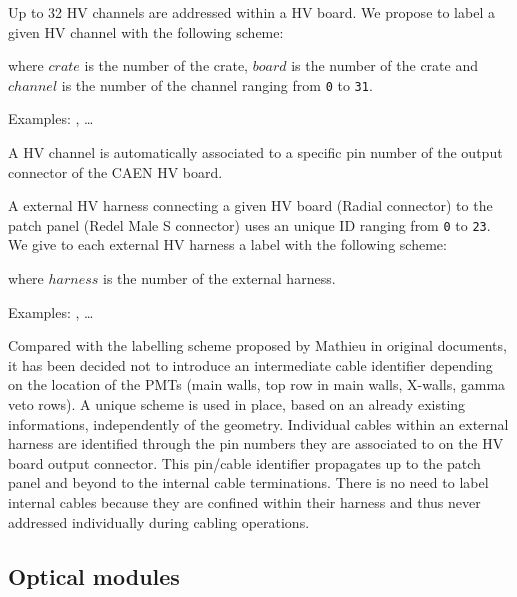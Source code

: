\vskip 10pt
\par\noindent Up  to 32 HV channels are addressed within a HV board.
 We propose to label a given HV channel with the following scheme:
\begin{center}
 \end{center}
where \texttt{$crate$} is the number of the crate,
  \texttt{$board$} is the number of the crate
and  \texttt{$channel$} is the number of the channel
ranging from
\texttt{0} to \texttt{31}.
\par\noindent Examples: , \dots
{}

\vskip 10pt
A HV channel is automatically associated to a specific pin number of
the output connector of the CAEN HV board. 

\vskip 10pt A external HV  harness  connecting a given HV board (Radial
connector) to the patch panel (Redel  Male S connector) uses an unique
ID  ranging from  \texttt{0} to  \texttt{23}.  We give to each
external HV harness a label with the following scheme:
\begin{center}
 \end{center}
where \texttt{$harness$} is the number of the external harness.
\par\noindent Examples: , \dots
{}

\vskip 10pt Compared with the  labelling scheme proposed by Mathieu in
original  documents,  it   has  been  decided  not   to  introduce  an
intermediate cable  identifier depending on  the location of  the PMTs
(main walls,  top row in  main walls,  X-walls, gamma veto rows).  A unique
scheme   is  used in place,   based   on  an   already  existing   informations,
independently of  the geometry.  Individual cables  within an external
harness are identified through the  pin numbers they are associated to
on  the   HV  board  output  connector.    This  pin/cable  identifier
propagates up  to the  patch panel  and beyond  to the  internal cable
terminations.  There is no need  to label internal cables because they
are   confined  within   their  harness   and  thus   never  addressed
individually during cabling operations.


\subsection{Optical modules}


